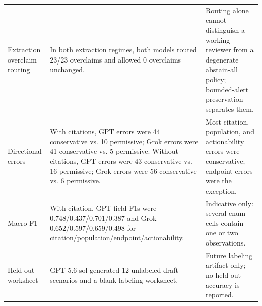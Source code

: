 \documentclass[pmlr,twocolumn,10pt]{jmlr}
\begin{document}
\begin{table}[tbp]
{\begin{tabular}{@{}>{\raggedright\arraybackslash}p{}>{\raggedright\arraybackslash}p{}>{\raggedright\arraybackslash}p{}@{}}
  Extraction overclaim routing & In both extraction regimes, both models routed 23/23 overclaims and allowed 0 overclaims unchanged. & Routing alone cannot distinguish a working reviewer from a degenerate abstain-all policy; bounded-alert preservation separates them. \\
  Directional errors & With citations, GPT errors were 44 conservative vs. 10 permissive; Grok errors were 41 conservative vs. 5 permissive. Without citations, GPT errors were 43 conservative vs. 16 permissive; Grok errors were 56 conservative vs. 6 permissive. & Most citation, population, and actionability errors were conservative; endpoint errors were the exception. \\
  Macro-F1 & With citation, GPT field F1s were 0.748/0.437/0.701/0.387 and Grok 0.652/0.597/0.659/0.498 for citation/population/endpoint/actionability. & Indicative only: several enum cells contain one or two observations. \\
  Held-out worksheet & GPT-5.6-sol generated 12 unlabeled draft scenarios and a blank labeling worksheet. & Future labeling artifact only; no held-out accuracy is reported. \\
  \bottomrule
  \end{tabular}}
\end{table}
\end{document}

